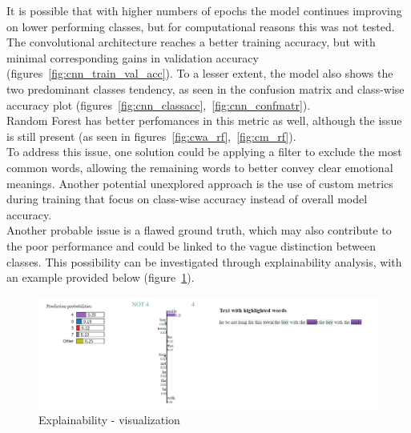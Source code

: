 It is possible that with higher numbers of epochs the model continues improving
on lower performing classes, but for computational reasons this was not tested.\\

The convolutional architecture reaches a better training accuracy, but with minimal
corresponding gains in validation accuracy
(figures~\ref{fig:cnn_train_val_acc}).
To a lesser extent, the model also shows the two predominant classes tendency,
as seen in the confusion matrix and class-wise accuracy plot
(figures~\ref{fig:cnn_classacc},~\ref{fig:cnn_confmatr}).\\

Random Forest has better perfomances in this metric as well,
although the issue is still present (as seen in
figures~\ref{fig:cwa_rf},~\ref{fig:cm_rf}).\\

To address this issue, one solution could be applying a filter to exclude the most
common words, allowing the remaining words to better convey clear emotional
meanings. Another potential unexplored approach is the use of custom
metrics during training that focus on class-wise accuracy instead of overall model
accuracy.\\

Another probable issue is a flawed ground truth, which may
also contribute to the poor performance and could be linked to the vague distinction
between classes.
This possibility can be investigated through explainability analysis, with an
example provided below (figure~\ref{fig:expl}).

\begin{figure}[H]
    \centering
    \includegraphics[scale= 0.55]{pictures/expl.png}
    \caption{Explainability - visualization}
    \label{fig:expl}
\end{figure}

